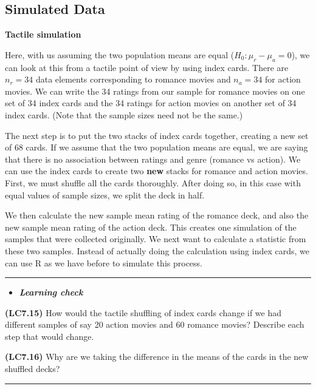 \documentclass[]{tufte-book}
\let\oldrule=\rule
\renewcommand{\rule}[1]{\oldrule{\linewidth}}
\newenvironment{rmdblock}[1]
  {\begin{shaded*}
  \begin{itemize}
  \renewcommand{\labelitemi}{
    \raisebox{-.7\height}[0pt][0pt]{
    }
  }
  \item
  }
  {
  \end{itemize}
  \end{shaded*}
  }
\newenvironment{learncheck}
  {\begin{rmdblock}{warning}}
  {\end{rmdblock}}
\begin{document}
\subsection{Simulated Data}\label{simulated-data-1}

\textbf{Tactile simulation}

Here, with us assuming the two population means are equal
(\(H_0: \mu_r - \mu_a = 0\)), we can look at this from a tactile point
of view by using index cards. There are \(n_r = 34\) data elements
corresponding to romance movies and \(n_a = 34\) for action movies. We
can write the 34 ratings from our sample for romance movies on one set
of 34 index cards and the 34 ratings for action movies on another set of
34 index cards. (Note that the sample sizes need not be the same.)

The next step is to put the two stacks of index cards together, creating
a new set of 68 cards. If we assume that the two population means are
equal, we are saying that there is no association between ratings and
genre (romance vs action). We can use the index cards to create two
\textbf{new} stacks for romance and action movies. First, we must
shuffle all the cards thoroughly. After doing so, in this case with
equal values of sample sizes, we split the deck in half.

We then calculate the new sample mean rating of the romance deck, and
also the new sample mean rating of the action deck. This creates one
simulation of the samples that were collected originally. We next want
to calculate a statistic from these two samples. Instead of actually
doing the calculation using index cards, we can use R as we have before
to simulate this process.

\begin{center}\rule{0.5\linewidth}{\linethickness}\end{center}

\begin{learncheck}
\textbf{\emph{Learning check}}
\end{learncheck}

\textbf{(LC7.15)} How would the tactile shuffling of index cards change
if we had different samples of say 20 action movies and 60 romance
movies? Describe each step that would change.

\textbf{(LC7.16)} Why are we taking the difference in the means of the
cards in the new shuffled decks?

\begin{center}\rule{0.5\linewidth}{\linethickness}\end{center}
\end{document}
